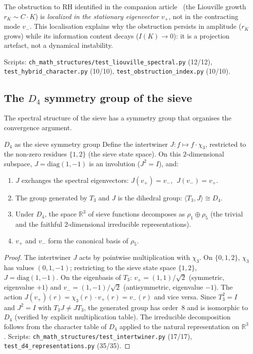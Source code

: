 \documentclass[12pt,a4paper]{article}
\begin{document}
The obstruction to RH identified in the companion article~\cite{companion_M1} (the Liouville growth
$r_K \sim C \cdot K$) is \emph{localized in the stationary
eigenvector $v_+$}, not in the contracting mode $v_-$. This
localisation explains why the obstruction persists in amplitude
($r_K$ grows) while its information content decays ($I(K) \to 0$):
it is a projection artefact, not a dynamical instability.

Scripts: \texttt{ch\_math\_structures/test\_liouville\_spectral.py} (12/12),
\texttt{test\_hybrid\_character.py} (10/10),
\texttt{test\_obstruction\_index.py} (10/10).

\subsection{The $D_4$ symmetry group of the sieve}
\label{sec:ch7b_d4}

The spectral structure of the sieve has a symmetry group that
organises the convergence argument.

\begin{thmbox}{$D_4$ as the sieve symmetry group}
\label{thm:d4_ext}
Define the intertwiner $J\colon f \mapsto f \cdot \chi_3$,
restricted to the non-zero residues $\{1,2\}$ (the sieve state space).
On this $2$-dimensional subspace, $J = \mathrm{diag}(1,-1)$ is an
involution ($J^2 = I$), and:
\begin{enumerate}[nosep]
\item $J$ exchanges the spectral eigenvectors:
  $J(v_+) = v_-$, $\;J(v_-) = v_+$.
\item The group generated by $T_3$ and $J$ is the dihedral group:
  $\langle T_3, J \rangle \cong D_4$.
\item Under $D_4$, the space $\mathbb{R}^3$ of sieve functions
  decomposes as $\rho_1 \oplus \rho_5$ (the trivial and the
  faithful 2-dimensional irreducible representations).
\item $v_+$ and $v_-$ form the canonical basis of $\rho_5$.
\end{enumerate}
\end{thmbox}

\begin{proof}
The intertwiner $J$ acts by pointwise multiplication with $\chi_3$.
On $\{0,1,2\}$, $\chi_3$ has values $(0, 1, -1)$; restricting
to the sieve state space $\{1,2\}$, $J = \mathrm{diag}(1,-1)$.
On the eigenbasis of $T_3$: $v_+ = (1, 1)/\sqrt{2}$
(symmetric, eigenvalue $+1$) and $v_- = (1, -1)/\sqrt{2}$
(antisymmetric, eigenvalue $-1$). The action
$J(v_+)(r) = \chi_3(r) \cdot v_+(r) = v_-(r)$ and vice versa.
Since $T_3^2 = I$ and $J^2 = I$ with $T_3 J \neq J T_3$, the
generated group has order~$8$ and is isomorphic to $D_4$ (verified
by explicit multiplication table). The irreducible decomposition
follows from the character table of $D_4$ applied to the natural
representation on $\mathbb{R}^3$.
Scripts: \texttt{ch\_math\_structures/test\_intertwiner.py} (17/17),
\texttt{test\_d4\_representations.py} (35/35).
\end{proof}
\end{document}
